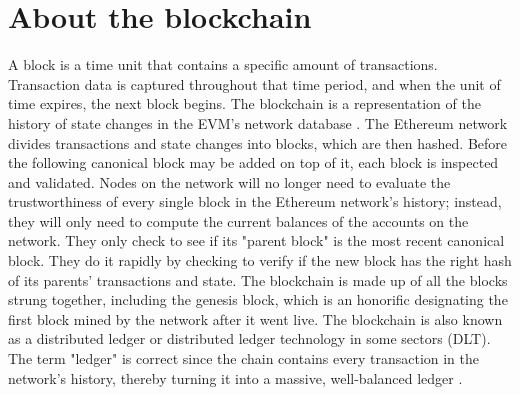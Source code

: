 \section{About the blockchain}
A block is a time unit that contains a specific amount of transactions. Transaction data is captured throughout that time period, and when the unit of time expires, the next block begins. The blockchain is a representation of the history of state changes in the EVM's network database \cite[43]{dannen2017introducing}.
The Ethereum network divides transactions and state changes into blocks, which are then hashed. Before the following canonical block may be added on top of it, each block is inspected and validated. Nodes on the network will no longer need to evaluate the trustworthiness of every single block in the Ethereum network's history; instead, they will only need to compute the current balances of the accounts on the network. They only check to see if its "parent block" is the most recent canonical block. They do it rapidly by checking to verify if the new block has the right hash of its parents' transactions and state.
The blockchain is made up of all the blocks strung together, including the genesis block, which is an honorific designating the first block mined by the network after it went live. The blockchain is also known as a distributed ledger or distributed ledger technology in some sectors (DLT). The term "ledger" is correct since the chain contains every transaction in the network's history, thereby turning it into a massive, well-balanced ledger \cite[55]{dannen2017introducing}. 
